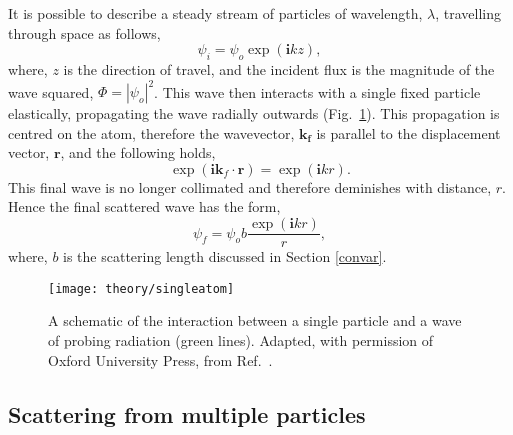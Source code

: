 It is possible to describe a steady stream of particles of wavelength, $\lambda$, travelling through space as follows,
%
\begin{equation}
	\psi_i = \psi_o \exp{(\mathbf{i} kz)},
	\label{equ:wave}
\end{equation}
%
where, $z$ is the direction of travel, and the incident flux is the magnitude of the wave squared, $\Phi = |\psi_o|^2$.
This wave then interacts with a single fixed particle elastically, propagating the wave radially outwards (Fig.~\ref{fig:singleatom}).
This propagation is centred on the atom, therefore the wavevector, $\mathbf{k_f}$ is parallel to the displacement vector, $\mathbf{r}$, and the following holds,
%
\begin{equation}
	\exp{(\mathbf{i}\mathbf{k}_f\cdot \mathbf{r})} = \exp{(\mathbf{i}kr)}.
\end{equation}
%
This final wave is no longer collimated and therefore deminishes with distance, $r$.
Hence the final scattered wave has the form,
%
\begin{equation}
	\psi_f = \psi_o b\frac{\exp{(\mathbf{i}kr)}}{r},
\end{equation}
%
where, $b$ is the scattering length discussed in Section \ref{convar}.
%
\begin{figure}
	\centering
	\texttt{[image: theory/singleatom]}
	\caption{A schematic of the interaction between a single particle and a wave of probing radiation (green lines). Adapted, with permission of Oxford University Press\textsuperscript{\textcopyright}, from Ref.~\cite{Sivia2011}.}
	\label{fig:singleatom}
\end{figure}
%

\subsection{Scattering from multiple particles}
\label{sec:multiscat}

